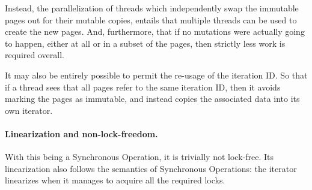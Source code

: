 Instead, the parallelization of threads which independently swap the immutable pages out for their mutable copies, entails that multiple threads can be used to create the new pages.
And, furthermore, that if no mutations were actually going to happen, either at all or in a subset of the pages, then strictly less work is required overall.

It may also be entirely possible to permit the re-usage of the iteration ID\@.
So that if a thread sees that all pages refer to the same iteration ID, then it avoids marking the pages as immutable, and instead copies the associated data into its own iterator.

\paragraph{Linearization and non-lock-freedom.}
With this being a Synchronous Operation, it is trivially not lock-free.
Its linearization also follows the semantics of Synchronous Operations: the iterator linearizes when it manages to acquire all the required locks.
